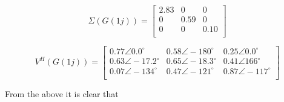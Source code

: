 \begin{equation}
	\Sigma(G(1j)) =
		\begin{bmatrix}
		2.83 & 0 & 0\\
		0 & 0.59 & 0\\
		0 & 0 & 0.10\\
		\end{bmatrix}
\end{equation}

\begin{equation}
	V^H(G(1j)) = 
		\begin{bmatrix}
		0.77\angle0.0^{\circ} & 0.58\angle-180^{\circ} & 0.25\angle0.0^{\circ}\\
		0.63\angle-17.2^{\circ} & 0.65\angle-18.3^{\circ} & 0.41\angle166^{\circ}\\
		0.07\angle-134^{\circ} & 0.47\angle-121^{\circ} & 0.87\angle-117^{\circ}\\
		\end{bmatrix}
\end{equation}

From the above it is clear that

